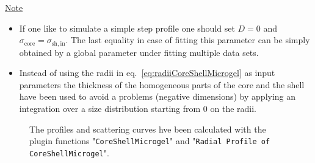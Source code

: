 \noindent
\underline{Note}
\begin{itemize}
  \item If one like to simulate a simple step profile one should set $D=0$ and
        $\sigma_\mathrm{core}=\sigma_\mathrm{sh,in}$. The last equality
        in case of fitting this parameter can be simply obtained by a global parameter
        under fitting multiple data sets.
  \item Instead of using the radii in eq.\ \ref{eq:radiiCoreShellMicrogel} as input parameters the thickness
        of the homogeneous parts of the core and the shell have been used to avoid a problems
        (negative dimensions) by applying an integration over a size distribution starting from 0 on the radii.
\end{itemize}
\begin{figure}[htb]
\begin{center}
\hfill
{}
\end{center}
\caption{The profiles and scattering curves hve been calculated with the plugin functions
"\texttt{CoreShellMicrogel}" and "\texttt{Radial Profile of CoreShellMicrogel}".}
\label{fig:profile:Example_CoreShellMicrogel}
\end{figure}

